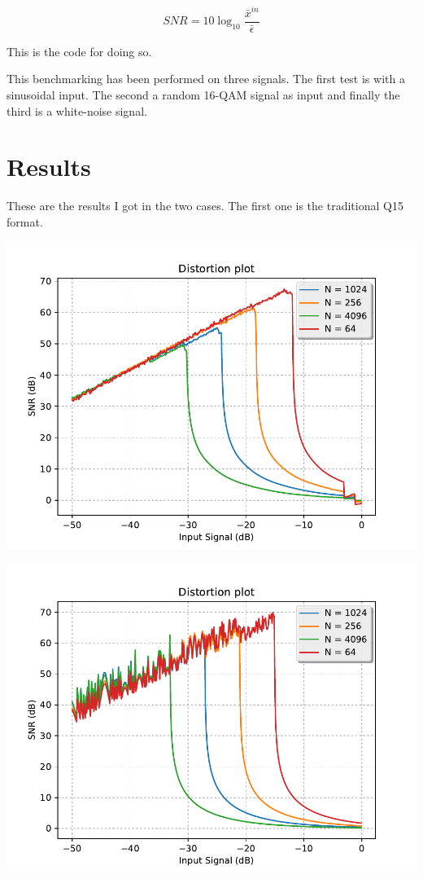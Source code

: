 \documentclass[paper=a4, fontsize=12pt]{scrartcl} %
\numberwithin{equation}{section} %
\numberwithin{figure}{section} %
\numberwithin{table}{section} %
\begin{document}
\begin{equation}
    SNR = 10\log_{10}\dfrac{\bar x^{in}}{\bar \epsilon}
\end{equation}

This is the code for doing so.



This benchmarking has been performed on three signals. The first test is with a
sinusoidal input. The second a random 16-QAM signal as input and finally the third
is a white-noise signal.

\section{Results}
These are the results I got in the two cases. The first one is the traditional
Q15 format.

\begin{minipage}{.5\textwidth}
    \includegraphics[width = \textwidth]{../figQ15/TEST_0.pdf}
\end{minipage}
\begin{minipage}{.5\textwidth}
    \includegraphics[width = \textwidth]{../figQ15/TEST_1.pdf}
\end{minipage}
\end{document}
